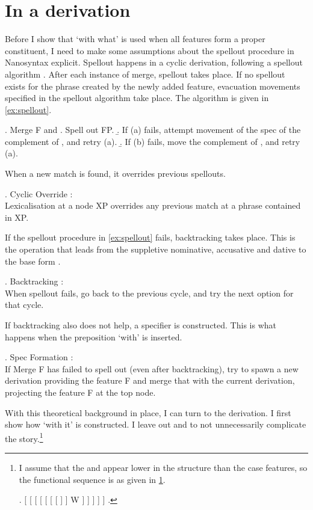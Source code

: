 \documentclass[12pt]{article}
\begin{document}
\section{In a derivation}\label{sec:derivation}

Before I show that  `with what' is used when all features form a proper constituent, I need to make some assumptions about the spellout procedure in Nanosyntax explicit. Spellout happens in a cyclic derivation, following a spellout algorithm \citep{starke2018}. After each instance of merge, spellout takes place. If no spellout exists for the phrase created by the newly added feature, evacuation movements specified in the spellout algorithm take place. The algorithm is given in \ref{ex:spellout}.

\ex. Merge F and \label{ex:spellout}
 \a. Spell out FP.
 \b. If (a) fails, attempt movement of the spec of the complement of , and retry (a).
 \b. If (b) fails, move the complement of , and retry (a).

When a new match is found, it overrides previous spellouts.

\ex. Cyclic Override \citep{starke2018}:\\
Lexicalisation at a node XP overrides any previous match at a phrase contained in XP.

If the spellout procedure in \ref{ex:spellout} fails, backtracking takes place. This is the operation that leads from the suppletive nominative, accusative and dative  to the base form .

\ex. Backtracking \citep{starke2018}:\\
When spellout fails, go back to the previous cycle, and try the next option for that cycle.\label{ex:backtracking}

If backtracking also does not help, a specifier is constructed. This is what happens when the preposition  `with' is inserted.

\ex. Spec Formation \citep{starke2018}:\\
If Merge F has failed to spell out (even after backtracking), try to spawn a new derivation providing the feature F and merge that with the current derivation, projecting the feature F at the top node.\label{ex:specformation}

With this theoretical background in place, I can turn to the derivation. I first show how  `with it' is constructed. I leave out  and  to not unnecessarily complicate the story.\footnote{I assume that the  and  appear lower in the structure than the case features, so the functional sequence is as given in \ref{ex:fseq}.

\ex. [ [ [ [ [ [ [  ]  ] W ]  ]  ]  ]  ]\label{ex:fseq}
\z.

\phantom{x}

}
\end{document}
